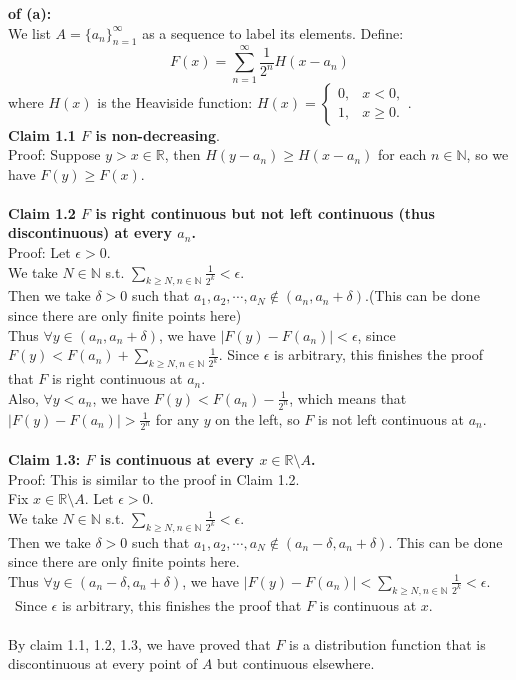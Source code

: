 \documentclass[lang=cn,11pt]{elegantbook}
\begin{document}
\begin{solution} \textbf{of (a):}\\
We list \( A = \{a_n\}_{n=1}^{\infty} \) as a sequence to label its elements. Define:
\[
F(x) = \sum_{n=1}^{\infty} \frac{1}{2^n} H(x - a_n)
\]
where \( H(x) \) is the Heaviside function: \(
H(x) =
\begin{cases}
0, & x < 0, \\
1, & x \geq 0.
\end{cases}
\).\\
\textbf{Claim 1.1 $F$ is non-decreasing}.\\
Proof: Suppose $y > x \in \mathbb{R}$, then $H(y-a_n) \geq H(x-a_n)$ for each $n \in \mathbb{N}$, so we have $F(y) \geq F(x)$.\\\\
\textbf{Claim 1.2 $F$ is right continuous but not left continuous (thus discontinuous) at every $a_n$.}\\
Proof: Let $\epsilon > 0$.\\
We take $N \in \mathbb{N}$ s.t. $\sum_{k\geq N, n\in \mathbb{N}} \frac{1}{2^k} < \epsilon$.\\
Then we take $\delta>0$ such that $a_1, a_2,\cdots, a_N \not \in (a_n, a_n+\delta)$.(This can be done since there are only finite points here)\\
Thus $\forall y \in (a_n, a_n+\delta)$, we have $|F(y) - F(a_n)| < \epsilon$, since $F(y) < F(a_n) + \sum_{k\geq N, n\in \mathbb{N}} \frac{1}{2^k}$.
Since $\epsilon$ is arbitrary, this finishes the proof that $F$ is right continuous at $a_n$.\\
Also, $\forall y < a_n$, we have $F(y) < F(a_n) - \frac{1}{2^n}$, which means that $|F(y) -F(a_n)|>\frac{1}{2^n}$ for any $y$ on the left, so $F$ is not left continuous at $a_n$.\\\\
\textbf{Claim 1.3: $F$ is continuous at every $x \in \mathbb{R} \setminus A$.}\\
Proof: This is similar to the proof in Claim 1.2. \\
Fix $x \in \mathbb{R} \setminus A$. Let  $\epsilon > 0$.\\
We take $N \in \mathbb{N}$ s.t. $\sum_{k\geq N, n\in \mathbb{N}} \frac{1}{2^k} < \epsilon$.\\
Then we take $\delta>0$ such that $a_1, a_2,\cdots, a_N \not \in (a_n-\delta, a_n+\delta)$. This can be done since there are only finite points here.\\
Thus $\forall y \in (a_n-\delta, a_n+\delta)$, we have $|F(y) - F(a_n)| <\sum_{k\geq N, n\in \mathbb{N}} \frac{1}{2^k} <  \epsilon$.\\\
Since $\epsilon$ is arbitrary, this finishes the proof that $F$ is continuous at $x$.\\\\

By claim 1.1, 1.2, 1.3, we have proved that $F$ is a distribution function that is discontinuous at every point of $A$ but continuous elsewhere.\\\\
\end{solution}
\end{document}
